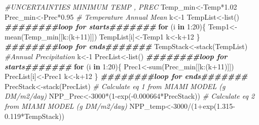 \documentclass[
  10pt,
  b5paper,
]{book}
\newenvironment{Shaded}{\begin{snugshade}}{\end{snugshade}}
\newcommand{\CommentTok}[1]{\textcolor[rgb]{0.56,0.35,0.01}{\textit{#1}}}
\newcommand{\ControlFlowTok}[1]{\textcolor[rgb]{0.13,0.29,0.53}{\textbf{#1}}}
\newcommand{\DecValTok}[1]{\textcolor[rgb]{0.00,0.00,0.81}{#1}}
\newcommand{\DocumentationTok}[1]{\textcolor[rgb]{0.56,0.35,0.01}{\textbf{\textit{#1}}}}
\newcommand{\FloatTok}[1]{\textcolor[rgb]{0.00,0.00,0.81}{#1}}
\newcommand{\FunctionTok}[1]{\textcolor[rgb]{0.00,0.00,0.00}{#1}}
\newcommand{\NormalTok}[1]{#1}
\newcommand{\OtherTok}[1]{\textcolor[rgb]{0.56,0.35,0.01}{#1}}
\newcommand{\SpecialCharTok}[1]{\textcolor[rgb]{0.00,0.00,0.00}{#1}}
\begin{document}
\begin{Shaded}
\begin{Highlighting}[]
\CommentTok{\#UNCERTAINTIES MINIMUM TEMP , PREC}
\NormalTok{Temp\_min}\OtherTok{\textless{}{-}}\NormalTok{Temp}\SpecialCharTok{*}\FloatTok{1.02}
\NormalTok{Prec\_min}\OtherTok{\textless{}{-}}\NormalTok{Prec}\SpecialCharTok{*}\FloatTok{0.95}
\CommentTok{\# Temperature Annual Mean }
\NormalTok{k}\OtherTok{\textless{}{-}}\DecValTok{1}
\NormalTok{TempList}\OtherTok{\textless{}{-}}\FunctionTok{list}\NormalTok{()}
\DocumentationTok{\#\#\#\#\#\#\#\#loop for starts\#\#\#\#\#\#\#}
\ControlFlowTok{for}\NormalTok{ (i }\ControlFlowTok{in} \DecValTok{1}\SpecialCharTok{:}\DecValTok{20}\NormalTok{)\{}
\NormalTok{Temp1}\OtherTok{\textless{}{-}}\FunctionTok{mean}\NormalTok{(Temp\_min[[k}\SpecialCharTok{:}\NormalTok{(k}\SpecialCharTok{+}\DecValTok{11}\NormalTok{)]])}
\NormalTok{TempList[i]}\OtherTok{\textless{}{-}}\NormalTok{Temp1}
\NormalTok{k}\OtherTok{\textless{}{-}}\NormalTok{k}\SpecialCharTok{+}\DecValTok{12}
\NormalTok{\}}
\DocumentationTok{\#\#\#\#\#\#\#\#loop for ends\#\#\#\#\#\#\#}
\NormalTok{TempStack}\OtherTok{\textless{}{-}}\FunctionTok{stack}\NormalTok{(TempList)}
\CommentTok{\#Annual Precipitation}
\NormalTok{k}\OtherTok{\textless{}{-}}\DecValTok{1}
\NormalTok{PrecList}\OtherTok{\textless{}{-}}\FunctionTok{list}\NormalTok{()}
\DocumentationTok{\#\#\#\#\#\#\#\#loop for starts\#\#\#\#\#\#\#}
\ControlFlowTok{for}\NormalTok{ (i }\ControlFlowTok{in} \DecValTok{1}\SpecialCharTok{:}\DecValTok{20}\NormalTok{)\{}
\NormalTok{Prec1}\OtherTok{\textless{}{-}}\FunctionTok{sum}\NormalTok{(Prec\_min[[k}\SpecialCharTok{:}\NormalTok{(k}\SpecialCharTok{+}\DecValTok{11}\NormalTok{)]])}
\NormalTok{PrecList[i]}\OtherTok{\textless{}{-}}\NormalTok{Prec1}
\NormalTok{k}\OtherTok{\textless{}{-}}\NormalTok{k}\SpecialCharTok{+}\DecValTok{12}
\NormalTok{\}}
\DocumentationTok{\#\#\#\#\#\#\#\#loop for ends\#\#\#\#\#\#\#}
\NormalTok{PrecStack}\OtherTok{\textless{}{-}}\FunctionTok{stack}\NormalTok{(PrecList)}
\CommentTok{\# Calculate eq 1 from MIAMI MODEL (g DM/m2/day)}
\NormalTok{NPP\_Prec}\OtherTok{\textless{}{-}}\DecValTok{3000}\SpecialCharTok{*}\NormalTok{(}\DecValTok{1}\SpecialCharTok{{-}}\FunctionTok{exp}\NormalTok{(}\SpecialCharTok{{-}}\FloatTok{0.000664}\SpecialCharTok{*}\NormalTok{PrecStack))}
\CommentTok{\# Calculate eq 2 from MIAMI MODEL (g DM/m2/day)}
\NormalTok{NPP\_temp}\OtherTok{\textless{}{-}}\DecValTok{3000}\SpecialCharTok{/}\NormalTok{(}\DecValTok{1}\SpecialCharTok{+}\FunctionTok{exp}\NormalTok{(}\FloatTok{1.315{-}0.119}\SpecialCharTok{*}\NormalTok{TempStack))}

\end{Highlighting}
\end{Shaded}
\end{document}
